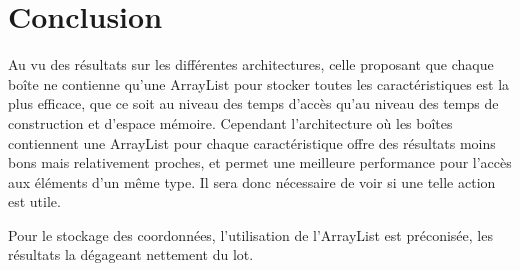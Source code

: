 \section{Conclusion}
Au vu des résultats sur les différentes architectures, celle proposant que chaque boîte ne contienne qu'une ArrayList pour stocker toutes les caractéristiques est la plus efficace, que ce soit au niveau des temps d'accès qu'au niveau des temps de construction et d'espace mémoire. Cependant l'architecture où les boîtes contiennent une ArrayList pour chaque caractéristique offre des résultats moins bons mais relativement proches, et permet une meilleure performance pour l'accès aux éléments d'un même type. Il sera donc nécessaire de voir si une telle action est utile.

Pour le stockage des coordonnées, l'utilisation de l'ArrayList est préconisée, les résultats la dégageant nettement du lot. 
